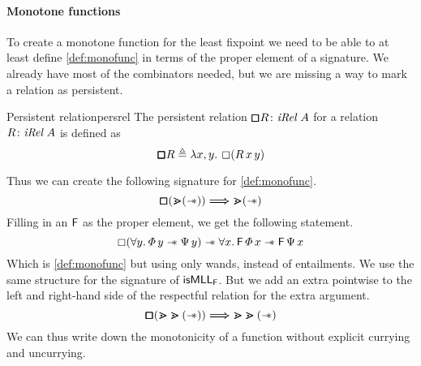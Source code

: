 \documentclass[thesis.tex]{subfiles}
\begin{document}
\paragraph*{Monotone functions}
To create a monotone function for the least fixpoint we need to be able to at least define \cref{def:monofunc} in terms of the proper element of a signature. We already have most of the combinators needed, but we are missing a way to mark a relation as persistent.
\begin{definition}{Persistent relation}{persrel}
  The persistent relation $\persrel\rel\colon\Rel\ \sigax$ for a relation $\rel\colon\Rel\ \sigax$ is defined as
  \[\persrel\rel \eqdef \Lam\var,\varB. \always (\rel\,\var\,\varB)\]
\end{definition}
Thus we can create the following signature for \cref{def:monofunc}.
\[\pmb{\mathop{\boxempty}} (\bm{\gtrdot} (\mathrel{-\!\!\ast})) \mathrel{\bm{\Longrightarrow}} \bm{\gtrdot} (\mathrel{-\!\!\ast})\]
Filling in an $\textsf{\upshape F}$ as the proper element, we get the following statement.
\[ \always(\All \varB. \pred\,\varB \wand \predB\,\varB) \wand \All \var. \hopred\,\pred\,\var \wand \hopred\,\predB\,\var \]
Which is \cref{def:monofunc} but using only wands, instead of entailments. We use the same structure for the signature of $\textsf{\upshape isMLL}_{\textsf{\upshape F}}$. But we add an extra pointwise to the left and right-hand side of the respectful relation for the extra argument.
\[\pmb{\mathop{\boxempty}} (\bm{\gtrdot}\bm{\gtrdot} (\mathrel{-\!\!\ast})) \mathrel{\bm{\Longrightarrow}} \bm{\gtrdot}\bm{\gtrdot} (\mathrel{-\!\!\ast})\]
We can thus write down the monotonicity of a function without explicit currying and uncurrying.
\end{document}
